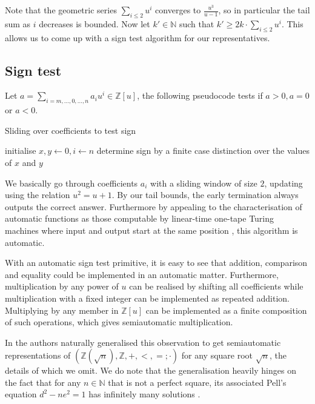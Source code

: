 \documentclass[british,a4paper,11pt,abstract=on]{scrreprt}
\theoremstyle{definition}
\theoremstyle{remark}
\newcommand{\N}{\mathbb{N}}
\newcommand{\Z}{\mathbb{Z}}
\begin{document}
Note that the geometric series \(\sum_{i\leq 2} u^i\) converges to \(\frac{u^3}{u-1}\),
so in particular the tail sum as \(i\) decreases is bounded.
Now let \(k' \in \N\) such that \(k' \geq 2k\cdot\sum_{i\leq 2}u^i\).
This allows us to come up with a sign test algorithm for our representatives.

\subsection{Sign test}

Let \(a = \sum_{i=m,\dots,0,\dots,n} a_i u^i \in \Z[u]\), the following pseudocode tests if \(a>0, a=0\) or \(a<0\).
\begin{algorithm}
    \caption{Sliding over coefficients to test sign}
    \DontPrintSemicolon
    initialise \(x, y \leftarrow 0, i\leftarrow n\)\;
    determine sign by a finite case distinction over the values of \(x\) and \(y\)
\end{algorithm}

We basically go through coefficients \(a_i\) with a sliding window of size \(2\), updating using the relation \(u^2 = u + 1\).
By our tail bounds, the early termination always outputs the correct answer.
Furthermore by appealing to the characterisation of automatic functions as those computable by linear-time one-tape Turing machines
where input and output start at the same position \autocite{Case2012}, this algorithm is automatic.

With an automatic sign test primitive, it is easy to see that addition, comparison and equality could be implemented in an automatic matter.
Furthermore, multiplication by any power of \(u\) can be realised by shifting all coefficients while multiplication with a fixed integer can be implemented as repeated addition.
Multiplying by any member in \(\Z[u]\) can be implemented as a finite composition of such operations, which gives semiautomatic multiplication.

In \autocite{semiauto} the authors naturally generalised this observation to get semiautomatic representations of
\((\Z(\sqrt{n}), \Z, +, <, =;\cdot)\) for any square root \(\sqrt{n}\), the details of which we omit.
We do note that the generalisation heavily hinges on the fact that for any \(n\in\N\) that is not a perfect square,
its associated Pell's equation \(d^2 - ne^2 = 1\) has infinitely many solutions \autocite{lagrange}.
\end{document}
